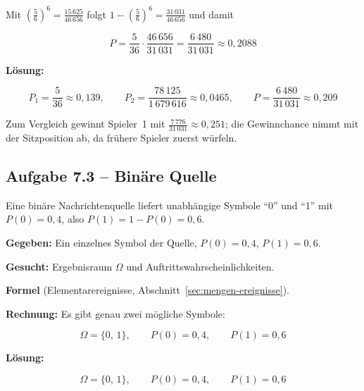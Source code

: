 \begin{beispiel}
Mit $\left(\tfrac{5}{6}\right)^{6} = \tfrac{15\,625}{46\,656}$ folgt
$1-\left(\tfrac{5}{6}\right)^{6} = \tfrac{31\,031}{46\,656}$ und damit

$$
P = \frac{5}{36}\cdot\frac{46\,656}{31\,031}
= \frac{6\,480}{31\,031} \approx 0{,}2088
$$

\textbf{Lösung:}

$$
\boxed{
P_1 = \frac{5}{36} \approx 0{,}139,\qquad
P_2 = \frac{78\,125}{1\,679\,616} \approx 0{,}0465,\qquad
P = \frac{6\,480}{31\,031} \approx 0{,}209
}
$$

Zum Vergleich gewinnt Spieler~1 mit $\tfrac{7\,776}{31\,031}\approx 0{,}251$; die
Gewinnchance nimmt mit der Sitzposition ab, da frühere Spieler zuerst würfeln.

\end{beispiel}

\subsection*{Aufgabe 7.3 – Binäre Quelle}

Eine binäre Nachrichtenquelle liefert unabhängige Symbole ``0'' und ``1'' mit
$P(0) = 0{,}4$, also $P(1) = 1 - P(0) = 0{,}6$.

\begin{beispiel}

\textbf{Gegeben:} Ein einzelnes Symbol der Quelle, $P(0)=0{,}4$, $P(1)=0{,}6$.

\textbf{Gesucht:} Ergebnisraum $\Omega$ und Auftrittswahrscheinlichkeiten.

\textbf{Formel} (Elementarereignisse, Abschnitt~\ref{sec:mengen-ereignisse}).

\textbf{Rechnung:} Es gibt genau zwei mögliche Symbole:

$$
\Omega = \{0,\,1\},\qquad P(0) = 0{,}4,\qquad P(1) = 0{,}6
$$

\textbf{Lösung:}

$$
\boxed{\Omega = \{0,\,1\},\qquad P(0) = 0{,}4,\qquad P(1) = 0{,}6}
$$

\end{beispiel}

